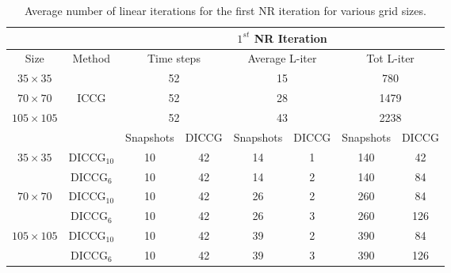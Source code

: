 \documentclass[12pt]{article}
\numberwithin{equation}{section}
\begin{document}
\begin{table}[!ht]\centering
\begin{minipage}{1\textwidth}
\vspace{-10pt}
\centering
\begin{tabular}{ |c|c|c|c|c|c|c|c|} 
  \hline
 & & \multicolumn{6}{|c|}{$1^{st}$ NR Iteration}  \\
\hline
Size&Method&  \multicolumn{2}{|c|}{Time steps} &\multicolumn{2}{|c|}{Average L-iter} & \multicolumn{2}{|c|}{Tot L-iter}\\
\hline
$35\times35$& &\multicolumn{2}{|c|}{52} & \multicolumn{2}{|c|}{15}& \multicolumn{2}{|c|}{780} \\

$70\times70$&ICCG&\multicolumn{2}{|c|}{52}& \multicolumn{2}{|c|}{28}& \multicolumn{2}{|c|}{1479}\\

$105\times105$& & \multicolumn{2}{|c|}{52} &\multicolumn{2}{|c|}{43} & \multicolumn{2}{|c|}{2238}\\
\hline
&&Snapshots&DICCG&Snapshots&DICCG&Snapshots&DICCG\\
\hline
$35\times35$&DICCG$_{10}$&10&42&14&1&140&42 \\
&DICCG$_6$&10&42&14&2&140&84 \\
\hline
$70\times70$&DICCG$_{10}$ &10&42 &26&2&260&84 \\
&DICCG$_6$ &10&42&26&3&260&126\\
\hline
$105\times105$&DICCG$_{10}$ &10&42 &39&2&390&84 \\
&DICCG$_6$&10&42&39&3&390&126 \\
\hline
 \end{tabular}
\caption{Average number of linear iterations for the first NR iteration for various grid sizes. }\label{table:liters1}
\end{minipage}
\end{table}
\end{document}
